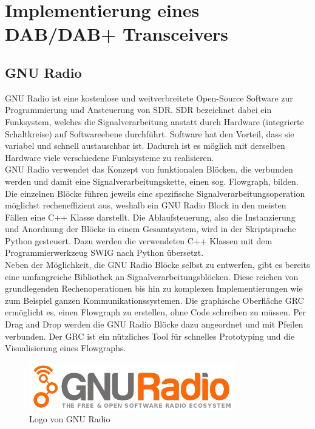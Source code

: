 \chapter{Implementierung eines DAB/DAB+ Transceivers}
\section{GNU Radio}
GNU Radio ist eine kostenlose und weitverbreitete Open-Source Software zur Programmierung und Ansteuerung von \ac{SDR}. \ac{SDR} bezeichnet dabei ein Funksystem, welches die Signalverarbeitung anstatt durch Hardware (integrierte Schaltkreise) auf Softwareebene durchführt. Software hat den Vorteil, dass sie variabel und schnell austauschbar ist. Dadurch ist es möglich mit derselben Hardware viele verschiedene Funksysteme zu realisieren.\\
GNU Radio verwendet das Konzept von funktionalen Blöcken, die verbunden werden und damit eine Signalverarbeitungskette, einen sog. Flowgraph, bilden. Die einzelnen Blöcke führen jeweils eine spezifische Signalverarbeitungsoperation möglichst recheneffizient aus, weshalb ein GNU Radio Block in den meisten Fällen eine C++ Klasse darstellt. Die Ablaufsteuerung, also die Instanzierung und Anordnung der Blöcke in einem Gesamtsystem, wird in der Skriptsprache Python gesteuert. Dazu werden die verwendeten C++ Klassen mit dem Programmierwerkzeug \ac{SWIG} nach Python übersetzt.\\
Neben der Möglichkeit, die GNU Radio Blöcke selbst zu entwerfen, gibt es bereits eine umfangreiche Bibliothek an Signalverarbeitungsblöcken. Diese reichen von grundlegenden Rechenoperationen bis hin zu komplexen Implementierungen wie zum Beispiel ganzen Kommunikationssystemen. Die graphische Oberfläche \ac{GRC} ermöglicht es, einen Flowgraph zu erstellen, ohne Code schreiben zu müssen. Per Drag and Drop werden die GNU Radio Blöcke dazu angeordnet und mit Pfeilen verbunden. Der GRC ist ein nützliches Tool für schnelles Prototyping und die Visualisierung eines Flowgraphs.\\

\begin{figure}[htb]
    \centering
    \includegraphics[width=0.8\textwidth]{figures/Gnuradio_logo.png}
    \caption{Logo von GNU Radio}
    \label{fig:gnu_radio_logo}
\end{figure}

